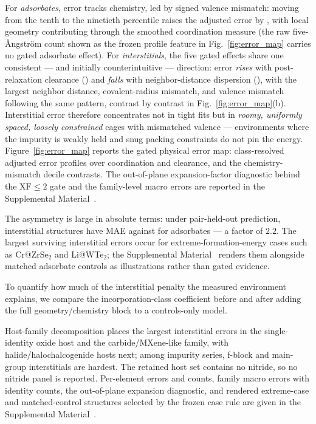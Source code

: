 For \emph{adsorbates}, error tracks chemistry, led by signed valence
mismatch: moving from the tenth to the ninetieth percentile raises the
adjusted error by \PRMPOneAdsValenceContrast\eV{}, with local geometry
contributing through the smoothed coordination measure (the raw
five-\AA{}ngstr\"om count shown as the frozen profile feature in
Fig.~\ref{fig:error_map} carries no gated adsorbate effect).  For
\emph{interstitials}, the five gated effects share one consistent --- and
initially counterintuitive --- direction: error \emph{rises} with
post-relaxation clearance (\PRMPOneIntClearanceContrast\eV{}) and
\emph{falls} with neighbor-distance dispersion
(\PRMPOneIntDispersionContrast\eV{}), with the largest neighbor
distance, covalent-radius mismatch, and valence mismatch following the
same pattern, contrast by contrast in Fig.~\ref{fig:error_map}(b).
Interstitial error therefore concentrates not in tight fits but in
\emph{roomy, uniformly spaced, loosely constrained} cages with mismatched
valence --- environments where the impurity is weakly held and snug
packing constraints do not pin the energy.
Figure~\ref{fig:error_map} reports the gated physical error map:
class-resolved adjusted error profiles over coordination and clearance,
and the chemistry-mismatch decile contrasts.  The out-of-plane
expansion-factor diagnostic behind the $\mathrm{XF}\leq2$ gate and the
family-level macro errors are reported in the Supplemental
Material~\cite{supplemental}.

The asymmetry is large in absolute terms: under pair-held-out prediction,
interstitial structures have MAE \PRMRepPairInterstitialMAE\eV{} against
\PRMRepPairAdsorbateMAE\eV{} for adsorbates --- a factor of $2.2$.  The
largest surviving interstitial errors occur for extreme-formation-energy
cases such as Cr@ZrSe$_2$ and Li@WTe$_2$; the Supplemental
Material~\cite{supplemental} renders them alongside matched adsorbate
controls as illustrations rather than gated evidence.

To quantify how much of the interstitial penalty the measured environment
explains, we compare the incorporation-class coefficient before and after
adding the full geometry/chemistry block to a controls-only model.
\PRMWThreeAttenuation{}%

Host-family decomposition places the largest interstitial errors in the
single-identity oxide host and the carbide/MXene-like family, with
halide/halochalcogenide hosts next; among impurity series, f-block and
main-group interstitials are hardest.  The retained host set contains no
nitride, so no nitride panel is reported.  Per-element errors and counts,
family macro errors with identity counts, the out-of-plane expansion
diagnostic, and rendered extreme-case and matched-control structures selected
by the frozen case rule are given in the Supplemental
Material~\cite{supplemental}.


